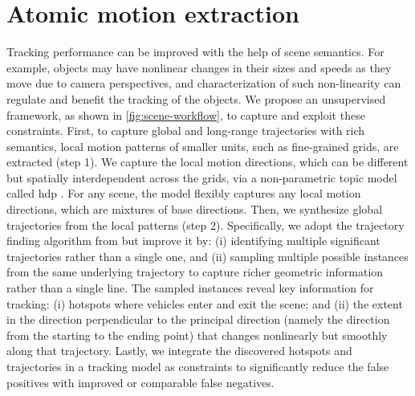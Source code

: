 \section{Atomic motion extraction}
\label{sec:scene-hdp}

Tracking performance can be improved with the help of scene semantics.
For example, objects may have nonlinear changes in their sizes and speeds as they move due to camera perspectives,
and characterization of such non-linearity can regulate and benefit the tracking of the objects.
We propose an unsupervised framework, as shown in \ref{fig:scene-workflow}, to capture and exploit these constraints.
First, to capture global and long-range trajectories
with rich semantics,
local motion patterns of smaller units, such as fine-grained grids, are extracted (step 1).
We capture the local motion directions, which can be different but spatially interdependent across the grids, via a non-parametric topic model called \gls{hdp} \cite{yee2006hierarchical,wang2009unsupervised}.
For any scene, the model flexibly captures any local motion directions, which are mixtures of base directions.
Then, we synthesize global trajectories from the local patterns (step 2).
Specifically,
we adopt the trajectory finding algorithm from \cite{wang2009unsupervised} but improve it by:
(i) identifying multiple significant trajectories rather than a single one, and
(ii) sampling multiple possible instances from the same underlying trajectory to capture richer geometric information rather than a single line.
The sampled instances reveal key information for tracking:
(i) hotspots where vehicles enter and exit the scene; and
(ii) the extent in the direction perpendicular to the principal direction
(namely the direction from the starting to the ending point)
that changes nonlinearly but smoothly along that trajectory.
Lastly, we integrate the discovered hotspots and trajectories
in a tracking model as constraints to significantly reduce the false positives with improved or comparable false negatives.



